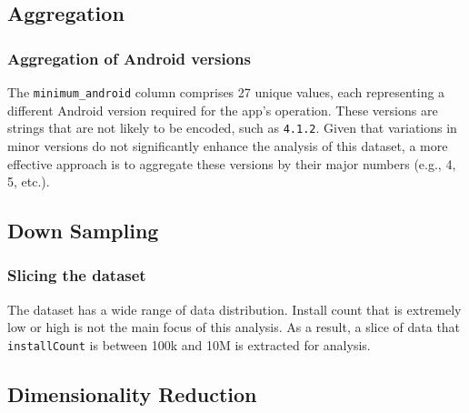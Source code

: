 \subsection{Aggregation}
\subsubsection{Aggregation of Android versions}
The \texttt{minimum\_android} column comprises 27 unique values, each representing a different Android version required for the app's operation. These versions are strings that are not likely to be encoded, such as \texttt{4.1.2}. Given that variations in minor versions do not significantly enhance the analysis of this dataset, a more effective approach is to aggregate these versions by their major numbers (e.g., 4, 5, etc.).

\subsection{Down Sampling}
\subsubsection{Slicing the dataset}
The dataset has a wide range of data distribution. Install count that is extremely low or high is not the main focus of this analysis. As a result, a slice of data that \texttt{installCount} is between 100k and 10M is extracted for analysis.

\subsection{Dimensionality Reduction}
